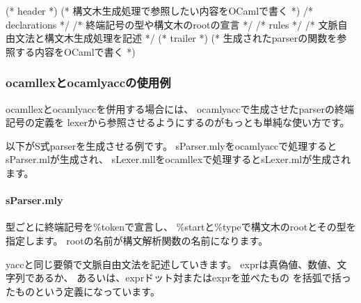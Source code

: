 \documentclass[mingoth,a4paper]{jsarticle}
\begin{document}
\begin{commandline}

  (* header *)
  (* 構文木生成処理で参照したい内容をOCamlで書く *)
  /* declarations */
  /* 終端記号の型や構文木のrootの宣言 */
  /* rules */
  /* 文脈自由文法と構文木生成処理を記述 */
  (* trailer *)
  (* 生成されたparserの関数を参照する内容をOCamlで書く *)

\end{commandline}

\subsubsection{ocamllexとocamlyaccの使用例}

ocamllexとocamlyaccを併用する場合には、
ocamlyaccで生成させたparserの終端記号の定義を
lexerから参照させるようにするのがもっとも単純な使い方です。

以下がS式parserを生成させる例です。
sParser.mlyをocamlyaccで処理するとsParser.mlが生成され、
sLexer.mllをocamllexで処理するとsLexer.mlが生成されます。

\par
\paragraph{sParser.mly}
型ごとに終端記号を\%tokenで宣言し、
\%startと\%typeで構文木のrootとその型を指定します。
rootの名前が構文解析関数の名前になります。

yaccと同じ要領で文脈自由文法を記述していきます。
exprは真偽値、数値、文字列であるか、
あるいは、exprドット対またはexprを並べたもの を括弧で括ったものという定義になっています。

\end{document}
